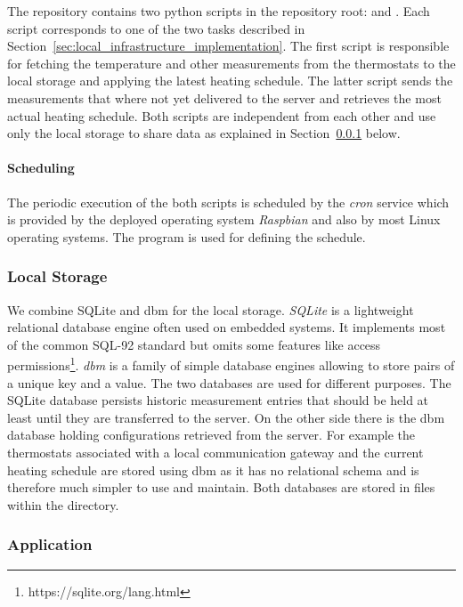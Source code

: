 The  repository contains two python scripts in the repository root:  and .
Each script corresponds to one of the two tasks described in Section~\ref{sec:local_infrastructure_implementation}.
The first script is responsible for fetching the temperature and other measurements from the thermostats to the local storage and applying the latest heating schedule.
The latter script sends the measurements that where not yet delivered to the server and retrieves the most actual heating schedule. Both scripts are independent from each other and use only the local storage to share data as explained in Section~\ref{sec:local_infrastructure_implementation_storage} below.

\paragraph{Scheduling}

The periodic execution of the both scripts is scheduled by the \emph{cron} service which is provided by the deployed operating system \emph{Raspbian} and also by most Linux operating systems.
The  program is used for defining the schedule.

\subsubsection{Local Storage}
\label{sec:local_infrastructure_implementation_storage}

We combine SQLite and dbm for the local storage.
\emph{SQLite} is a lightweight relational database engine often used on embedded systems.
It implements most of the common SQL-92 standard but omits some features like access permissions\footnote{https://sqlite.org/lang.html}.
\emph{dbm} is a family of simple database engines allowing to store pairs of a unique key and a value.
The two databases are used for different purposes.
The SQLite database persists historic measurement entries that should be held at least until they are transferred to the server.
On the other side there is the dbm database holding configurations retrieved from the server.
For example the thermostats associated with a local communication gateway and the current heating schedule are stored using dbm as it has no relational schema and is therefore much simpler to use and maintain.
Both databases are stored in files within the  directory.

\subsubsection{Application}

